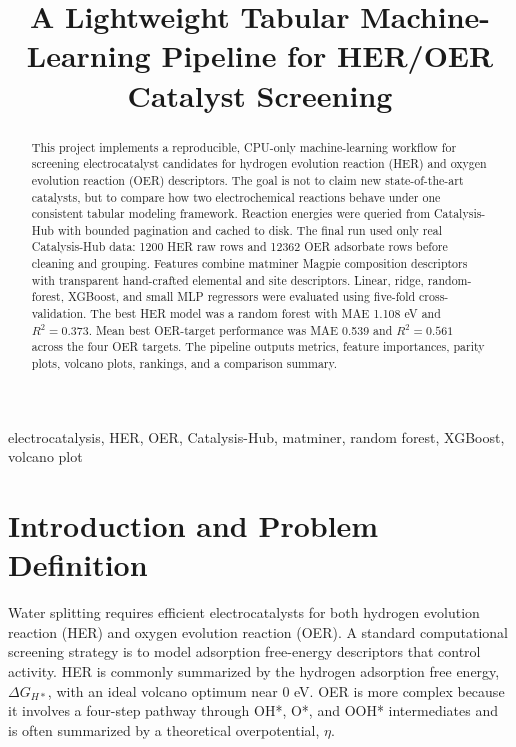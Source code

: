 \documentclass[conference]{IEEEtran}
\begin{document}
\title{A Lightweight Tabular Machine-Learning Pipeline for HER/OER Catalyst Screening}

\author{
}

\maketitle

\begin{abstract}
This project implements a reproducible, CPU-only machine-learning workflow for screening electrocatalyst candidates for hydrogen evolution reaction (HER) and oxygen evolution reaction (OER) descriptors. The goal is not to claim new state-of-the-art catalysts, but to compare how two electrochemical reactions behave under one consistent tabular modeling framework. Reaction energies were queried from Catalysis-Hub with bounded pagination and cached to disk. The final run used only real Catalysis-Hub data: 1200 HER raw rows and 12362 OER adsorbate rows before cleaning and grouping. Features combine matminer Magpie composition descriptors with transparent hand-crafted elemental and site descriptors. Linear, ridge, random-forest, XGBoost, and small MLP regressors were evaluated using five-fold cross-validation. The best HER model was a random forest with MAE 1.108 eV and $R^2=0.373$. Mean best OER-target performance was MAE 0.539 and $R^2=0.561$ across the four OER targets. The pipeline outputs metrics, feature importances, parity plots, volcano plots, rankings, and a comparison summary.
\end{abstract}

\begin{IEEEkeywords}
electrocatalysis, HER, OER, Catalysis-Hub, matminer, random forest, XGBoost, volcano plot
\end{IEEEkeywords}

\section{Introduction and Problem Definition}
Water splitting requires efficient electrocatalysts for both hydrogen evolution reaction (HER) and oxygen evolution reaction (OER). A standard computational screening strategy is to model adsorption free-energy descriptors that control activity. HER is commonly summarized by the hydrogen adsorption free energy, $\Delta G_{H*}$, with an ideal volcano optimum near 0 eV. OER is more complex because it involves a four-step pathway through OH*, O*, and OOH* intermediates and is often summarized by a theoretical overpotential, $\eta$.
\end{document}
